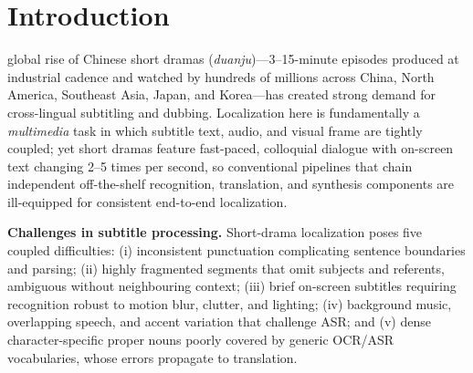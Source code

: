 \documentclass[journal]{IEEEtran}
\begin{document}
\section{Introduction}
\label{sec:introduction}
 global rise of Chinese short dramas (\textit{duanju})---3--15-minute episodes produced at industrial cadence and watched by hundreds of millions across China, North America, Southeast Asia, Japan, and Korea---has created strong demand for cross-lingual subtitling and dubbing.
Localization here is fundamentally a \emph{multimedia} task in which subtitle text, audio, and visual frame are tightly coupled; yet short dramas feature fast-paced, colloquial dialogue with on-screen text changing 2--5 times per second, so conventional pipelines that chain independent off-the-shelf recognition, translation, and synthesis components are ill-equipped for consistent end-to-end localization.

\textbf{Challenges in subtitle processing.}
Short-drama localization poses five coupled difficulties: (i) inconsistent punctuation complicating sentence boundaries and parsing; (ii) highly fragmented segments that omit subjects and referents, ambiguous without neighbouring context; (iii) brief on-screen subtitles requiring recognition robust to motion blur, clutter, and lighting; (iv) background music, overlapping speech, and accent variation that challenge ASR; and (v) dense character-specific proper nouns poorly covered by generic OCR/ASR vocabularies, whose errors propagate to translation.
\end{document}
